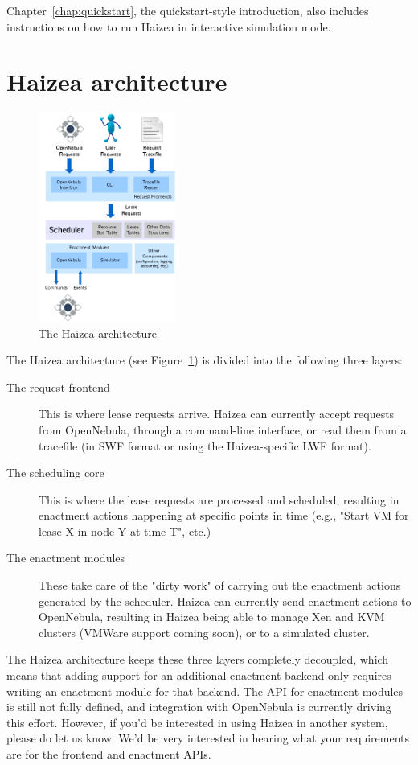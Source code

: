 Chapter~\ref{chap:quickstart}, the quickstart-style introduction, also includes instructions on how to run Haizea in interactive simulation mode.

\section{Haizea architecture}

\begin{figure}
\begin{center}
\includegraphics[width=0.4\textwidth]{images/architecture.png}
\end{center}
\caption{The Haizea architecture}
\label{fig:arch}
\end{figure}

The Haizea architecture (see Figure~\ref{fig:arch}) is divided into the following three layers:

\begin{description}
\item[The request frontend] This is where lease requests arrive. Haizea can currently accept requests from OpenNebula, through a command-line interface, or read them from a tracefile (in SWF format or using the Haizea-specific LWF format).
\item[The scheduling core] This is where the lease requests are processed and scheduled, resulting in enactment actions happening at specific points in time (e.g., "Start VM for lease X in node Y at time T", etc.)
\item[The enactment modules] These take care of the "dirty work" of carrying out the enactment actions generated by the scheduler. Haizea can currently send enactment actions to OpenNebula, resulting in Haizea being able to manage Xen and KVM clusters (VMWare support coming soon), or to a simulated cluster.
\end{description}

The Haizea architecture keeps these three layers completely decoupled, which means that adding support for an additional enactment backend only requires writing an enactment module for that backend. The API for enactment modules is still not fully defined, and integration with OpenNebula is currently driving this effort. However, if you'd be interested in using Haizea in another system, please do let us know. We'd be very interested in hearing what your requirements are for the frontend and enactment APIs.
